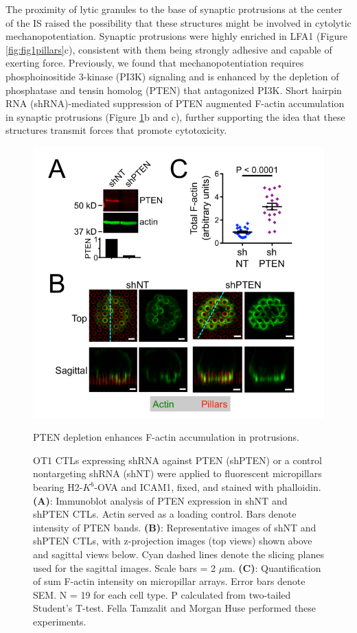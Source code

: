The proximity of lytic granules to the base of synaptic protrusions at the center of the IS raised the possibility that these structures might be involved in cytolytic mechanopotentiation. Synaptic protrusions were highly enriched in LFA1 (Figure \ref{fig:fig1pillars}c), consistent with them being strongly adhesive and capable of exerting force. Previously, we found that mechanopotentiation requires phosphoinositide 3-kinase (PI3K) signaling and is enhanced by the depletion of phosphatase and tensin homolog (PTEN) that antagonized PI3K. Short hairpin RNA (shRNA)-mediated suppression of PTEN augmented F-actin accumulation in synaptic protrusions (Figure \ref{fig:fig1ptenprotrusions}b and c), further supporting the idea that these structures transmit forces that promote cytotoxicity.

\begin{figure}[htbp]
	\centering
	\includegraphics[width=\textwidth]{../figures/chapter2/fig1ptenprotrusions.png}
	\caption{PTEN depletion enhances F-actin accumulation in protrusions.}
	\caption*{OT1 CTLs expressing shRNA against PTEN (shPTEN) or a control nontargeting shRNA (shNT) were applied to fluorescent micropillars bearing H2-$K^{b}$-OVA and ICAM1, fixed, and stained with phalloidin. \textbf{(A)}: Immunoblot analysis of PTEN expression in shNT and shPTEN CTLs. Actin served as a loading control. Bars denote intensity of PTEN bands. \textbf{(B)}: Representative images of shNT and shPTEN CTLs, with z-projection images (top views) shown above and sagittal views below. Cyan dashed lines denote the slicing planes used for the sagittal images. Scale bars = 2 $\mu$m. \textbf{(C)}: Quantification of sum F-actin intensity on micropillar arrays. Error bars denote SEM. N = 19 for each cell type. P calculated from two-tailed Student’s T-test. Fella Tamzalit and Morgan Huse performed these experiments.}
	\label{fig:fig1ptenprotrusions}
\end{figure}

